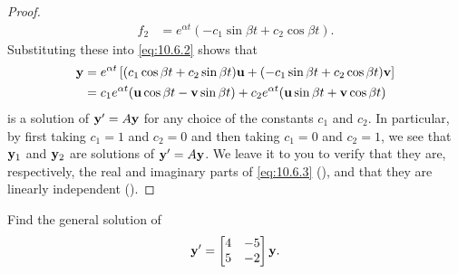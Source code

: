 \begin{proof}
\begin{align*}
f_2&=e^{\alpha t}(-c_1\sin\beta t+c_2\cos\beta t).
\end{align*}
Substituting these into \eqref{eq:10.6.2} shows that
\begin{equation} \label{eq:10.6.5}
\begin{aligned}
\mathbf{y}&=e^{\alpha t}\left[(c_1\cos\beta t+c_2\sin\beta t)\mathbf{u}
+(-c_1\sin\beta t+c_2\cos\beta t)\mathbf{v}\right]\\
&=c_1e^{\alpha t}(\mathbf{u}\cos\beta t-\mathbf{v}\sin\beta t)
+c_2e^{\alpha t}(\mathbf{u}\sin\beta t+\mathbf{v}\cos\beta t)
\end{aligned}
\end{equation}
is a solution of $\mathbf{y}'=A\mathbf{y}$ for any choice of the constants
$c_1$ and $c_2$. In particular, by first taking $c_1=1$ and $c_2=0$
and then taking $c_1=0$ and $c_2=1$, we see that $\mathbf{y}_1$ and $\mathbf{y}_2$ are solutions of $ \mathbf{y}'=A\mathbf{y}$. We leave it to you to
verify that they are, respectively, the real and imaginary parts of
\eqref{eq:10.6.3} (), and that they are linearly
independent ().
\end{proof}

\begin{example}\label{example:10.6.1}
 Find the general solution of
\begin{equation} \label{eq:10.6.6}
\mathbf{y}'=\begin{bmatrix}4&-5\\5&-2\end{bmatrix}\mathbf{y}.
\end{equation}
\end{example}

